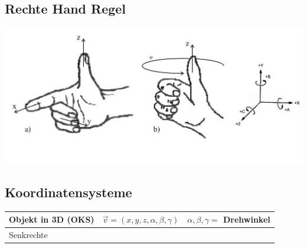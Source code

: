 \documentclass[8pt,a4paper,landscape]{scrartcl}
\begin{document}
\begin{multicols*}{3}
\subsection*{Rechte Hand Regel}
\includegraphics[width=\columnwidth]{handRotation.jpg}

\subsection*{Koordinatensysteme}
\begin{tabularx}{\columnwidth}{l|X|c}
	Objekt in 3D (OKS) & $\vec{v} = (x,y,z,\alpha,\beta,\gamma)$ & $\alpha,\beta,\gamma = $ Drehwinkel \\ \hline
	Senkrechte &  \\ 
	
\end{tabularx}


\end{multicols*}
\end{document}
